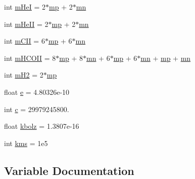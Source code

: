 \begin{DoxyCompactItemize}
int \hyperlink{namespaceconstants_af49326d192aac38eba034ab6650bf4da}{m\+HeI} = 2$\ast$\hyperlink{namespaceconstants_aebdc70445dfb9e72960792ba2efe97ab}{mp} + 2$\ast$\hyperlink{namespaceconstants_ad53f198771c37114065171d857217e26}{mn}
\item 
int \hyperlink{namespaceconstants_abc800d0399d254c2a946705bfadf7c41}{m\+He\+II} = 2$\ast$\hyperlink{namespaceconstants_aebdc70445dfb9e72960792ba2efe97ab}{mp} + 2$\ast$\hyperlink{namespaceconstants_ad53f198771c37114065171d857217e26}{mn}
\item 
int \hyperlink{namespaceconstants_a4039b9e829bd537908aaf35345f3d434}{m\+C\+II} = 6$\ast$\hyperlink{namespaceconstants_aebdc70445dfb9e72960792ba2efe97ab}{mp} + 6$\ast$\hyperlink{namespaceconstants_ad53f198771c37114065171d857217e26}{mn}
\item 
int \hyperlink{namespaceconstants_a649f0308f09cf86c9658ebbddab3a4ce}{m\+H\+C\+O\+II} = 8$\ast$\hyperlink{namespaceconstants_aebdc70445dfb9e72960792ba2efe97ab}{mp} + 8$\ast$\hyperlink{namespaceconstants_ad53f198771c37114065171d857217e26}{mn} + 6$\ast$\hyperlink{namespaceconstants_aebdc70445dfb9e72960792ba2efe97ab}{mp} + 6$\ast$\hyperlink{namespaceconstants_ad53f198771c37114065171d857217e26}{mn} + \hyperlink{namespaceconstants_aebdc70445dfb9e72960792ba2efe97ab}{mp} + \hyperlink{namespaceconstants_ad53f198771c37114065171d857217e26}{mn}
\item 
int \hyperlink{namespaceconstants_a6286571f2bce388e5cba5df404f6a605}{m\+H2} = 2$\ast$\hyperlink{namespaceconstants_aebdc70445dfb9e72960792ba2efe97ab}{mp}
\item 
float \hyperlink{namespaceconstants_a25294f89fd53b34a138ea616e9c0ccee}{e} = 4.\+80326e-\/10
\item 
int \hyperlink{namespaceconstants_ae66e312a5fe9e01cf32156cf8f5528b3}{c} = 29979245800.
\item 
float \hyperlink{namespaceconstants_a484db162dd0953d02cc095d9e0fd90e5}{kbolz} = 1.\+3807e-\/16
\item 
int \hyperlink{namespaceconstants_aeabe86f2d98904c2c00c4885a6f4df9d}{kms} = 1e5
\end{DoxyCompactItemize}


\subsection{Variable Documentation}
\mbox{\label{namespaceconstants_ae66e312a5fe9e01cf32156cf8f5528b3}} 
